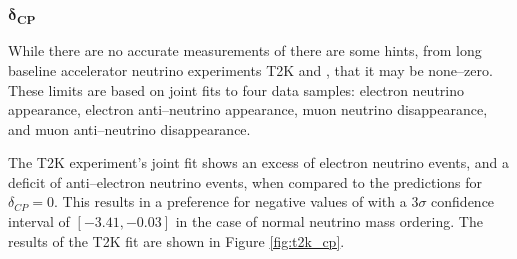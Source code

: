 \subsubsection*{$\boldsymbol{\delta_{CP}}$}
While there are no accurate measurements of \dcp{} there are some hints, from
long baseline accelerator neutrino experiments T2K and \nova{}, that it
may be none--zero. These limits are based on joint fits to four data samples: 
electron neutrino appearance, electron anti--neutrino appearance, muon 
neutrino disappearance, and muon anti--neutrino disappearance.

The T2K experiment's joint fit shows an excess of electron neutrino events, and 
a deficit of anti--electron neutrino events, when compared to the predictions 
for \(\delta_{CP} = 0\). This results in a preference for negative values of 
\dcp{} with a \(3\sigma\) confidence interval of \([-3.41, -0.03]\) in the 
case of normal neutrino mass ordering. The results of the T2K fit are shown 
in Figure \ref{fig:t2k_cp}\cite{Abe2019}.


